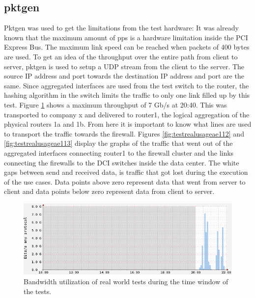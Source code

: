 \subsection{pktgen}
Pktgen was used to get the limitations from the test hardware: It was already known that the maximum amount of pps is a hardware limitation inside the PCI Express Bus. 
The maximum link speed can be reached when packets of 400 bytes are used. To get an idea of the throughput over the entire path from client to server, pktgen is used to setup a UDP stream from the client to the server. 
The source IP address and port towards the destination IP address and port are the same. Since aggregated interfaces are used from the test switch to the router, the hashing algorithm in the switch limits the traffic to only one link filled up by this test. 
Figure \ref{fig:surftest} shows a maximum throughput of 7 Gb/s at 20:40. This was transported to company x and delivered to router1, the logical aggregation of the physical routers 1a and 1b. From here it is important to know what lines are used to transport the traffic towards the firewall.
Figures \ref{fig:testrealusageae112} and \ref{fig:testrealusageae113} display the graphs of the traffic that went out of the aggregated interfaces connecting router1 to the firewall cluster and the links connecting the firewalls to the DCI switches inside the data center. The white gaps between send and received data, is traffic that got lost during the execution of the use cases. Data points above zero represent data that went from server to client and data points below zero represent data from client to server. 
   
\begin{figure}[H]
  \includegraphics[scale=0.5]{images/test-link-usage.png}
  \caption{Bandwidth utilization of real world tests during the time window of the tests.}
  \label{fig:surftest}
\end{figure}

